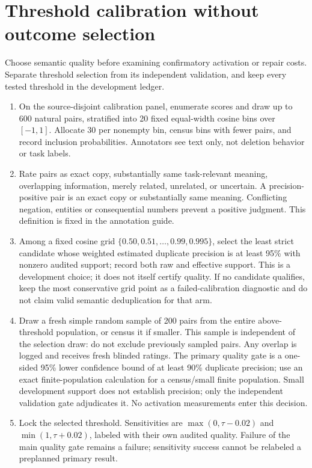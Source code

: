 \documentclass[11pt,a4paper]{article}
\begin{document}
\section{Threshold calibration without outcome selection}
Choose semantic quality before examining confirmatory activation or repair costs. Separate threshold selection from its independent validation, and keep every tested threshold in the development ledger.

\begin{enumerate}
\item On the source-disjoint calibration panel, enumerate scores and draw up to 600 natural pairs, stratified into 20 fixed equal-width cosine bins over $[-1,1]$. Allocate 30 per nonempty bin, census bins with fewer pairs, and record inclusion probabilities. Annotators see text only, not deletion behavior or task labels.
\item Rate pairs as exact copy, substantially same task-relevant meaning, overlapping information, merely related, unrelated, or uncertain. A precision-positive pair is an exact copy or substantially same meaning. Conflicting negation, entities or consequential numbers prevent a positive judgment. This definition is fixed in the annotation guide.
\item Among a fixed cosine grid $\{0.50,0.51,\ldots,0.99,0.995\}$, select the least strict candidate whose weighted estimated duplicate precision is at least 95\% with nonzero audited support; record both raw and effective support. This is a development choice; it does not itself certify quality. If no candidate qualifies, keep the most conservative grid point as a failed-calibration diagnostic and do not claim valid semantic deduplication for that arm.
\item Draw a fresh simple random sample of 200 pairs from the entire above-threshold population, or census it if smaller. This sample is independent of the selection draw: do not exclude previously sampled pairs. Any overlap is logged and receives fresh blinded ratings. The primary quality gate is a one-sided 95\% lower confidence bound of at least 90\% duplicate precision; use an exact finite-population calculation for a census/small finite population. Small development support does not establish precision; only the independent validation gate adjudicates it. No activation measurements enter this decision.
\item Lock the selected threshold. Sensitivities are $\max(0,\tau-0.02)$ and $\min(1,\tau+0.02)$, labeled with their own audited quality. Failure of the main quality gate remains a failure; sensitivity success cannot be relabeled a preplanned primary result.
\end{enumerate}
\end{document}
